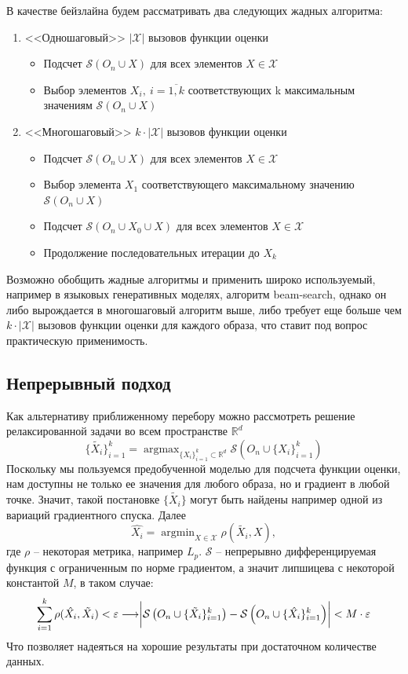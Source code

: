 \documentclass[a4paper,14pt]{extarticle}
\DeclareMathOperator*{\argmax}{argmax}
\DeclareMathOperator*{\argmin}{argmin}
\begin{document}
			В качестве бейзлайна будем рассматривать два следующих жадных алгоритма:
			\begin{enumerate}
				\item <<Одношаговый>> $|\mathcal{X}|$ вызовов функции оценки
				\begin{itemize}
					\item Подсчет $\mathcal{S}(O_n \cup X)$ для всех элементов $X\in \mathcal{X}$
					\item Выбор элементов $X_i,~i=\overline{1,k}$ соответствующих k максимальным значениям $\mathcal{S}(O_n \cup X)$
				\end{itemize}
				\item <<Многошаговый>> $k\cdot|\mathcal{X}|$ вызовов функции оценки
				\begin{itemize}
					\item Подсчет $\mathcal{S}(O_n \cup X)$ для всех элементов $X\in \mathcal{X}$
					\item Выбор элемента $X_1$ соответствующего максимальному значению $\mathcal{S}(O_n \cup X)$
					\item Подсчет $\mathcal{S}(O_n \cup X_0\cup X)$ для всех элементов $X\in \mathcal{X}$
					\item Продолжение последовательных итерации до $X_k$
				\end{itemize}
			\end{enumerate}
			
			Возможно обобщить жадные алгоритмы и применить широко используемый, например в языковых генеративных моделях, алгоритм beam-search, однако он либо вырождается в многошаговый алгоритм выше, либо требует еще больше чем $k\cdot|\mathcal{X}|$ вызовов функции оценки для каждого образа, что ставит под вопрос практическую применимость.
			
			\subsection{Непрерывный подход}\label{continuous}
			Как альтернативу приближенному перебору можно рассмотреть решение релаксированной задачи во всем пространстве $\mathbb{R}^d$
			$$\{\tilde{X_i}\}_{i=1}^k= \argmax_{\{X_i\}_{i=1}^k\subset\mathbb{R}^d} \mathcal{S}\left(O_n\cup\{X_i\}_{i=1}^k\right)$$
			Поскольку мы пользуемся предобученной моделью для подсчета функции оценки, нам доступны не только ее значения для любого образа, но и градиент в любой точке. Значит, такой постановке $\{\tilde{X_i}\}$ могут быть найдены например одной из вариаций градиентного спуска.
			Далее 
			$$\hat{X_i} =  \argmin_{X\in\mathcal{X}} \rho(\tilde{X_i}, X),$$
			где $\rho$ -- некоторая метрика, например $L_p$. 
			$\mathcal{S}$ -- непрерывно дифференцируемая функция с ограниченным по норме градиентом, а значит липшицева с некоторой константой $M$, в таком случае:
			$$\sum_{i=1}^k\rho(\hat{X_i}, \tilde{X_i}) < \varepsilon\longrightarrow \biggr{|}\mathcal{S}\left(O_n\cup\{\tilde{X_i}\}_{i=1}^k\right) - \mathcal{S}\left(O_n\cup\{\hat{X_i}\}_{i=1}^k\right)\biggr{|} < M\cdot\varepsilon$$
			Что позволяет надеяться на хорошие результаты при достаточном количестве данных.
			
\end{document}
